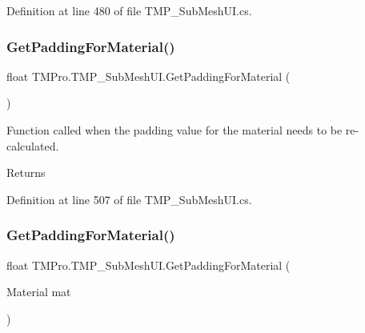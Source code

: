 Definition at line 480 of file T\+M\+P\+\_\+\+Sub\+Mesh\+U\+I.\+cs.

\mbox{\label{class_t_m_pro_1_1_t_m_p___sub_mesh_u_i_a7d5c58041ab5f14071b3a39108bd3408}} 
\subsubsection{\texorpdfstring{GetPaddingForMaterial()}{GetPaddingForMaterial()}\hspace{0.1cm}{\footnotesize\ttfamily [1/2]}}
{\footnotesize\ttfamily float T\+M\+Pro.\+T\+M\+P\+\_\+\+Sub\+Mesh\+U\+I.\+Get\+Padding\+For\+Material (\begin{DoxyParamCaption}{ }\end{DoxyParamCaption})}



Function called when the padding value for the material needs to be re-\/calculated. 

\begin{DoxyReturn}{Returns}

\end{DoxyReturn}


Definition at line 507 of file T\+M\+P\+\_\+\+Sub\+Mesh\+U\+I.\+cs.

\mbox{\label{class_t_m_pro_1_1_t_m_p___sub_mesh_u_i_a0039a3effee201741725425d2376c801}} 
\subsubsection{\texorpdfstring{GetPaddingForMaterial()}{GetPaddingForMaterial()}\hspace{0.1cm}{\footnotesize\ttfamily [2/2]}}
{\footnotesize\ttfamily float T\+M\+Pro.\+T\+M\+P\+\_\+\+Sub\+Mesh\+U\+I.\+Get\+Padding\+For\+Material (\begin{DoxyParamCaption}\item[{Material}]{mat }\end{DoxyParamCaption})}



